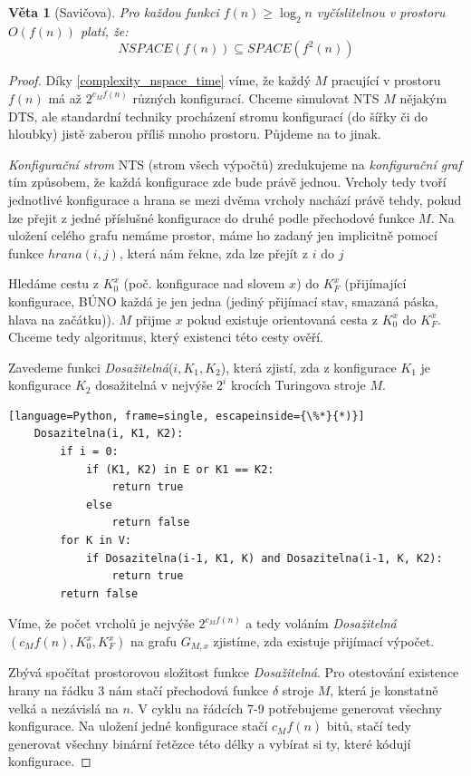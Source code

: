 \documentclass[11pt]{report} %
\newtheorem{theorem}{Věta}[section]
\begin{document}
\begin{theorem}[Savičova]
Pro každou funkci $f(n) \geq \log_2n$ vyčíslitelnou v prostoru $O(f(n))$ platí, že:
	$$NSPACE(f(n)) \subseteq SPACE(f^2(n))$$
\end{theorem}
\begin{proof}
Díky \ref{complexity_nspace_time} víme, že každý $M$ pracující v prostoru $f(n)$ má až $2^{c_Mf(n)}$ různých konfigurací. Chceme simulovat NTS $M$ nějakým DTS, ale standardní techniky procházení stromu konfigurací (do šířky či do hloubky) jistě zaberou příliš mnoho prostoru. Půjdeme na to jinak.

\textit{Konfigurační strom} NTS (strom všech výpočtů) zredukujeme na \textit{konfigurační graf} tím způsobem, že každá konfigurace zde bude právě jednou. Vrcholy tedy tvoří jednotlivé konfigurace a hrana se mezi dvěma vrcholy nachází právě tehdy, pokud lze přejit z jedné příslušné konfigurace do druhé podle přechodové funkce $M$. Na uložení celého grafu nemáme prostor, máme ho zadaný jen implicitně pomocí funkce $hrana(i,j)$, která nám řekne, zda lze přejít z $i$ do $j$

Hledáme cestu z $K_0^x$ (poč. konfigurace nad slovem $x$) do $K_F^x$ (přijímající konfigurace, BÚNO každá je jen jedna (jediný přijímací stav, smazaná páska, hlava na začátku)). $M$ přijme $x$ pokud existuje orientovaná cesta z $K_0^x$ do $K_F^x$. Chceme tedy algoritmus, který existenci této cesty ověří. 

Zavedeme funkci \textit{Dosažitelná}($i,K_1,K_2$), která zjistí, zda z konfigurace $K_1$ je konfigurace $K_2$ dosažitelná
v nejvýše $2^i$ krocích Turingova stroje $M$.
\bigskip

\begin{minipage}{\linewidth}
	\begin{lstlisting}[language=Python, frame=single, escapeinside={\%*}{*)}]
	Dosazitelna(i, K1, K2):
		if i = 0:
			if (K1, K2) in E or K1 == K2:
				return true
			else
				return false
		for K in V:
			if Dosazitelna(i-1, K1, K) and Dosazitelna(i-1, K, K2):
				return true
		return false
	\end{lstlisting}
\end{minipage}

Víme, že počet vrcholů je nejvýše $2^{c_Mf(n)}$ a tedy voláním \textit{Dosažitelná}$(c_Mf(n), K_0^x, K_F^x)$ na grafu $G_{M,x}$ zjistíme, zda existuje přijímací výpočet.

Zbývá spočítat prostorovou složitost funkce \textit{Dosažitelná}. Pro otestování existence hrany na řádku 3 nám stačí přechodová funkce $\delta$ stroje $M$, která je konstatně velká a nezávislá na $n$. V cyklu na řádcích 7-9 potřebujeme generovat všechny konfigurace. Na uložení jedné konfigurace stačí $c_Mf(n)$ bitů, stačí tedy generovat všechny binární řetězce této délky a vybírat si ty, které kódují konfigurace.


\end{proof}
\end{document}
